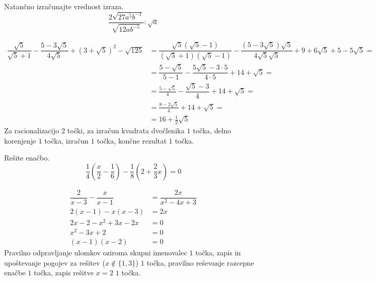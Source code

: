 \documentclass[addpoints,12pt]{exam}
\begin{document}
\begin{questions}

    \newpage


    \question[5]
    Natančno izračunajte vrednost izraza.
    $$ \dfrac{2\sqrt{27a^5b^{-1}}}{\sqrt{12ab^{-5}}}:\sqrt{a} $$

    \begin{solution}[7cm]
        \begin{align*} 
            \dfrac{\sqrt{5}}{\sqrt{5}+1}-\dfrac{5-3\sqrt{5}}{4\sqrt{5}}+\left(3+\sqrt{5}\right)^2-\sqrt{125}&=\dfrac{\sqrt{5}(\sqrt{5}-1)}{(\sqrt{5}+1)(\sqrt{5}-1)}-\dfrac{(5-3\sqrt{5})\sqrt{5}}{4\sqrt{5}\sqrt{5}}+9+6\sqrt{5}+5-5\sqrt{5}= \\
                                                                                                            &=\dfrac{5-\sqrt{5}}{5-1}-\dfrac{5\sqrt{5}-3\cdot 5}{4\cdot 5}+14+\sqrt{5}= \\
                                                                                                            &=\frac{5-\sqrt{5}}{4}-\dfrac{\sqrt{5}-3}{4}+14+\sqrt{5}= \\
                                                                                                            &=\frac{8-2\sqrt{5}}{4}+14+\sqrt{5}= \\
                                                                                                            &=16+\frac{1}{2}\sqrt{5}
        \end{align*}
        Za racionalizacijo $2$ točki, za izračun kvadrata dvočlenika $1$ točka, delno korenjenje $1$ točka, izračun $1$ točka, končne rezultat $1$ točka.
    \end{solution}
    
    
    \newpage

    \question[3]
    Rešite enačbo.
    $$ \dfrac{1}{4}\left(\dfrac{x}{2}-\dfrac{1}{6}\right)-\dfrac{1}{8}\left(2+\dfrac{2}{3}x\right)=0 $$
    
    
    \begin{solution}[4cm]
        \begin{align*} 
            \dfrac{2}{x-3}-\dfrac{x}{x-1} &=\dfrac{2x}{x^2-4x+3} \\
            2(x-1)-x(x-3) &= 2x \\
            2x-2-x^2+3x-2x &=0 \\
            x^2-3x+2 &=0 \\
            (x-1)(x-2) &=0
        \end{align*}
        Pravilno odpravljanje ulomkov oziroma skupni imenovalec $1$ točka, zapis in upoštevanje pogojev za rešitev ($x\notin\{1,3\}$) $1$ točka, pravilno reševanje razcepne enačbe $1$ točka, zapis rešitve $x=2$ $1$ točka.
    \end{solution}


\end{questions}
\end{document}
